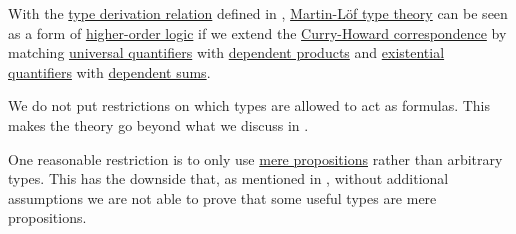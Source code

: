 \begin{remark}\label{rem:mltt_hol}
  With the \hyperref[def:type_derivation_relation]{type derivation relation} defined in , \hyperref[def:mltt]{Martin-L\"of type theory} can be seen as a form of \hyperref[con:higher_order_logic]{higher-order logic} if we extend the \hyperref[con:curry_howard_correspondence]{Curry-Howard correspondence} by matching \hyperref[def:higher_order_language/quantifiers/universal]{universal quantifiers} with \hyperref[def:dependent_product]{dependent products} and \hyperref[def:higher_order_language/quantifiers/existential]{existential quantifiers} with \hyperref[def:dependent_sum]{dependent sums}.

  We do not put restrictions on which types are allowed to act as formulas. This makes the theory go beyond what we discuss in .

  One reasonable restriction is to only use \hyperref[def:mere_proposition]{mere propositions} rather than arbitrary types. This has the downside that, as mentioned in , without additional assumptions we are not able to prove that some useful types are mere propositions.
\end{remark}

